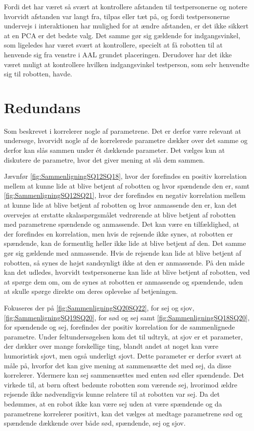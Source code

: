 Fordi det har været så svært at kontrollere afstanden til testpersonerne og notere hvorvidt afstanden var langt fra, tilpas eller tæt på, og fordi testpersonerne undervejs i interaktionen har mulighed for at ændre afstanden, er det ikke sikkert at en PCA er det bedste valg. Det samme gør sig gældende for indgangsvinkel, som ligeledes har været svært at kontrollere, specielt at få robotten til at henvende sig fra venstre i AAL grundet placeringen. Derudover har det ikke været muligt at kontrollere hvilken indgangsvinkel testperson, som selv henvendte sig til robotten, havde. 


\section{Redundans}
\label{DiskussionRedundansSkalaer}
%
Som beskrevet i  korrelerer nogle af parametrene. Det er derfor være relevant at undersøge, hvorvidt nogle af de korrelerede parametre dækker over det samme og derfor kan slås sammen under ét dækkende parameter. Det vælges kun at diskutere de parametre, hvor det giver mening at slå dem sammen. 

Jævnfør \autoref{fig:SammenligningSQ12SQ18}, hvor der forefindes en positiv korrelation mellem at kunne lide at blive betjent af robotten og hvor spændende den er, samt \autoref{fig:SammenligningSQ12SQ21}, hvor der forefindes en negativ korrelation mellem at kunne lide at blive betjent af robotten og hvor anmassende den er, kan det overvejes at erstatte skalaspørgsmålet vedrørende at blive betjent af robotten med parametrene spændende og anmassende. Det kan være en tilfældighed, at der forefindes en korrelation, men hvis de rejsende ikke synes, at robotten er spændende, kan de formentlig heller ikke lide at blive betjent af den. Det samme gør sig gældende med anmassende. Hvis de rejsende kan lide at blive betjent af robotten, så synes de højst sandsynligt ikke at den er anmassende. På den måde kan det udledes, hvorvidt testpersonerne kan lide at blive betjent af robotten, ved at spørge dem om, om de synes at robotten er anmassende og spændende, uden at skulle spørge direkte om deres oplevelse af betjeningen.

Fokuseres der på \autoref{fig:SammenligningSQ20SQ22}, for sej og sjov, \autoref{fig:SammenligningSQ19SQ20}, for sød og sej samt \autoref{fig:SammenligningSQ18SQ20}, for spændende og sej, forefindes der positiv korrelation for de sammenlignede parametre. Under feltundersøgelsen kom det til udtryk, at sjov er et parameter, der dækker over mange forskellige ting, blandt andet at noget kan være humoristisk sjovt, men også underligt sjovt. Dette parameter er derfor svært at måle på, hvorfor det kan give mening at sammensætte det med sej, da disse korrelerer. Ydermere kan sej sammensættes med enten sød eller spændende. Det virkede til, at børn oftest bedømte robotten som værende sej, hvorimod ældre rejsende ikke nødvendigvis kunne relatere til at robotten var sej. Da det bedømmes, at en robot ikke kan være sej uden at være spændende og da parametrene korrelerer positivt, kan det vælges at medtage parametrene sød og spændende dækkende over både sød, spændende, sej og sjov.  

